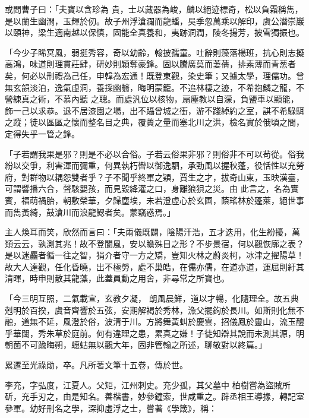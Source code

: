 \begin{pinyinscope}
 或問曹子曰：「夫寶以含珍為
 貴，士以藏器為峻，麟以絕迹標奇，松以負霜稱雋，是以蘭生幽澗，玉輝於仞。故子州浮滄瀾而龍蟠，吳季忽萬乘以解印，虞公潛崇巖以頤神，梁生適南越以保慎，固能全真養和，夷跡洞潤，陵冬揚芳，披雪獨振也。



 「今少子睎冥風，弱挺秀容，奇以幼齡，翰披孺童。吐辭則藻落楊班，抗心則志擬高鴻，味道則理貫莊肆，研妙則穎奪豪鋒。固以騰廣莫而萋蒨，排素薄而青葱者矣，何必以刑禮為己任，申韓為宏通！既登東觀，染史筆；又據太學，理儒功。曾無玄韻淡泊，逸氣虛洞，養採幽翳，晦明蒙籠。不追林棲之迹，不希抱鱗之龍，不營練真之術，不慕內聽
 之聰。而處汎位以核物，扇塵教以自濛，負鹽車以顯能，飾一己以求恭。退不居漆園之場，出不躡曾城之衝，游不踐綽約之室，諆不希騄駬之蹤；徒以區區之懷而整名目之典，覆蕢之量而塞北川之洪，檢名實於俄頃之間，定得失乎一管之鋒。



 「子若謂我果是邪？則是不必以合俗。子若云俗果非邪？則俗非不可以茍從。俗我紛以交爭，利害渾而彌重，何異執朽轡以御逸駟，承勁風以握秋蓬，役恬性以充勞府，對群物以耦怨雙者乎？子不聞乎終軍之穎，賈生之才，拔奇山東，玉映漢臺，可謂響播六合，聲駭嬰孩，而見毀絳灌之口，身離狼狽之災。由
 此言之，名為實賓，福萌禍胎，朝敷榮華，夕歸塵埃，未若澄虛心於玄圃，蔭瑤林於蓬萊，絕世事而雋黃綺，鼓滄川而浪龍鰓者矣。蒙竊惑焉。」



 主人煥耳而笑，欣然而言曰：「夫兩儀既闢，陰陽汗浩，五才迭用，化生紛擾，萬類云云，孰測其兆！故不登閬風，安以瞻殊目之形？不步景宿，何以觀恢廓之表？是以迷麤者循一往之智，狷介者守一方之矯，豈知火林之蔚炎柯，冰津之擢陽草！故大人達觀，任化昏曉，出不極勞，處不巢皓，在儒亦儒，在道亦道，運屈則紆其清暉，時申則散其龍藻，此蓋員動之用舍，非尋常之所寶也。



 「今三明互照，二氣載宣，玄教夕凝，
 朗風晨鮮，道以才暢，化隨理全。故五典剋明於百揆，虞音齊響於五弦，安期解褐於秀林，漁父擺鉤於長川。如斯則化無不融，道無不延，風澄於俗，波清于川。方將舞黃虯於慶雲，招儀鳳於靈山，流玉醴乎華闥，秀朱草於庭前。何有違理之患，累真之嫌！子徒知辯其說而未測其源，明朝菌不可踰晦朔，蟪蛄無以觀大年，固非管翰之所述，聊敬對以終篇。」



 累遷至光祿勛，卒。凡所著文筆十五卷，傳於世。



 李充，字弘度，江夏人。父矩，江州刺史。充少孤，其父墓中
 柏樹嘗為盜賊所斫，充手刃之，由是知名。善楷書，妙參鐘索，世咸重之。辟丞相王導掾，轉記室參軍。幼好刑名之學，深抑虛浮之士，嘗著《學箴》，稱：




\end{pinyinscope}
